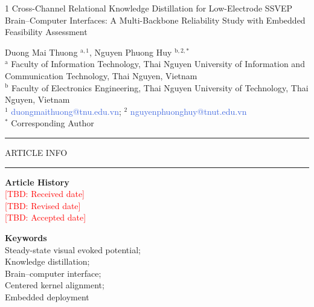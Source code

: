 \documentclass[11pt,a4paper,twoside,asymmetric]{article}
\newcommand{\tbd}[1]{\textcolor{red}{[TBD: #1]}}
\begin{document}
\begin{flushleft}
{\LARGE{
\begin{spacing}{1}
Cross-Channel Relational Knowledge Distillation for Low-Electrode SSVEP Brain--Computer Interfaces: A Multi-Backbone Reliability Study with Embedded Feasibility Assessment
\end{spacing}
}}
\vspace{1em}
Duong Mai Thuong $^{\text{a},1}$, Nguyen Phuong Huy $^{\text{b},2,\ast}$\\
\vspace{.5em}
\footnotesize{$^\text{a}$ Faculty of Information Technology, Thai Nguyen University of Information and Communication Technology, Thai Nguyen, Vietnam\\
$^\text{b}$ Faculty of Electronics Engineering, Thai Nguyen University of Technology, Thai Nguyen, Vietnam\\
$^1$ \textcolor{RoyalBlue}{duongmaithuong@tnu.edu.vn}; $^2$ \textcolor{RoyalBlue}{nguyenphuonghuy@tnut.edu.vn}\\
$^\ast$ Corresponding Author}
\end{flushleft}
{\color{RoyalBlue} \rule{\linewidth}{0.4mm}}
\vspace{.5em}
\noindent
\parbox[t][][s]{0.26\textwidth}{ARTICLE INFO
\vspace{.5em}

{\color{RoyalBlue}\rule{\linewidth}{0.4mm}}

\vspace{1em}
\footnotesize{\textbf{Article History}\\
\tbd{Received date}\\
\tbd{Revised date}\\
\tbd{Accepted date}\\
}

\vspace{1em}
\small{\footnotesize{\textbf{Keywords}\\
Steady-state visual evoked potential;\\
Knowledge distillation;\\
Brain--computer interface;\\
Centered kernel alignment;\\
Embedded deployment}
}
\vspace{.5em}
\vspace{\fill}
}
\parbox{0.025\textwidth}{\hspace{0.5em}}
\end{document}
